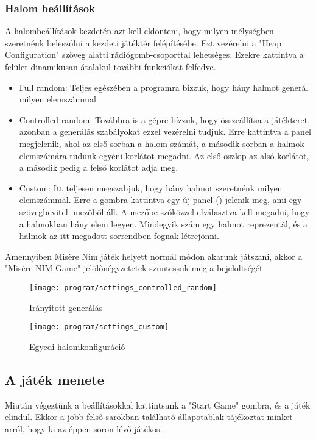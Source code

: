 \subsubsection{Halom beállítások}
A halombeállítások kezdetén azt kell eldönteni, hogy milyen mélységben szeretnénk beleszólni a kezdeti játéktér felépítésébe. Ezt vezérelni a "Heap Configuration" szöveg alatti rádiógomb-csoporttal lehetséges. Ezekre kattintva a felület dinamikusan átalakul további funkciókat felfedve. 

\begin{itemize}
	\item Full random: Teljes egészében a programra bízzuk, hogy hány halmot generál milyen elemszámmal
	\item Controlled random: Továbbra is a gépre bízzuk, hogy összeállítsa a játékteret, azonban a generálás szabályokat ezzel vezérelni tudjuk. Erre kattintva a  panel megjelenik, ahol az első sorban a halom számát, a második sorban a halmok elemszámára tudunk egyéni korlátot megadni. Az első oszlop az alsó korlátot, a második pedig a felső korlátot adja meg.
	\item Custom: Itt teljesen megszabjuk, hogy hány halmot szeretnénk milyen elemszámmal. Erre a gombra kattintva egy új panel () jelenik meg, ami egy szövegbeviteli mezőből áll. A mezőbe szóközzel elválasztva kell megadni, hogy a halmokban hány elem legyen. Mindegyik szám egy halmot reprezentál, és a halmok az itt megadott sorrendben fognak létrejönni.
\end{itemize}

Amennyiben Misère Nim játék helyett normál módon akarunk játszani, akkor a "Misère NIM Game" jelölőnégyzetetek szüntessük meg a bejelöltségét.

\begin{figure}[h]
	\texttt{[image: program/settings\_controlled\_random]}
	\centering
	\caption{Irányított generálás}
	\label{fig:nim_settings_controlledrandom}
\end{figure}

\begin{figure}[h]
	\texttt{[image: program/settings\_custom]}
	\centering
	\caption{Egyedi halomkonfiguráció}
	\label{fig:nim_settings_custom}
\end{figure}

\subsection{A játék menete}
Miután végeztünk a beállításokkal kattintsunk a "Start Game" gombra, és a játék elindul. Ekkor a jobb felső sarokban található állapotablak tájékoztat minket arról, hogy ki az éppen soron lévő játékos. \\

